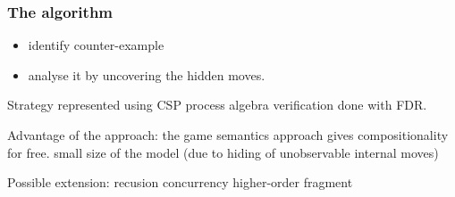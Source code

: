 \subsubsection{The algorithm}
\begin{itemize}
\item identify counter-example
\item analyse it by uncovering the hidden moves.
\end{itemize}

Strategy represented using CSP process algebra verification done
with FDR.

Advantage of the approach: the game semantics approach gives
compositionality for free. small size of the model (due to hiding of
unobservable internal moves)

Possible extension: recusion concurrency higher-order fragment
